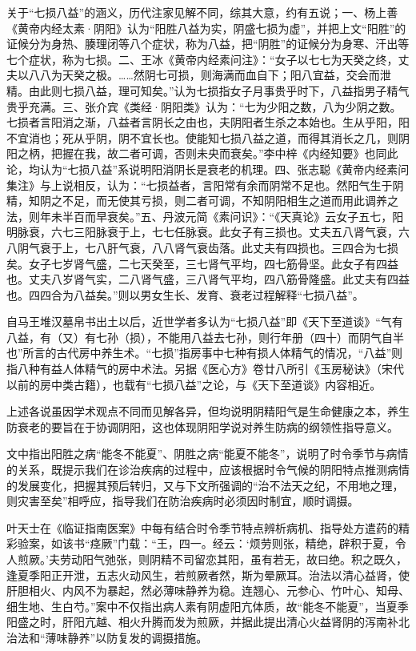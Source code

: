 \documentclass[12pt]{ctexbook}
\begin{document}
关于“七损八益”的涵义，历代注家见解不同，综其大意，约有五说；一、杨上善《黄帝内经太素·阴阳》认为“阳胜八益为实，阴盛七损为虚”，并把上文“阳胜”的证候分为身热、腠理闭等八个症状，称为八益，把“阴胜”的证候分为身寒、汗出等七个症状，称为七损。二、王冰《黄帝内经素问注》：“女子以七七为天癸之终，丈夫以八八为天癸之极。……然阴七可损，则海满而血自下；阳八宜益，交会而泄精。由此则七损八益，理可知矣。”认为七损指女子月事贵乎时下，八益指男子精气贵乎充满。三、张介宾《类经·阴阳类》认为：“七为少阳之数，八为少阴之数。七损者言阳消之渐，八益者言阴长之由也，夫阴阳者生杀之本始也。生从乎阳，阳不宜消也；死从乎阴，阴不宜长也。使能知七损八益之道，而得其消长之几，则阴阳之柄，把握在我，故二者可调，否则未央而衰矣。”李中梓《内经知要》也同此论，均认为“七损八益”系说明阳消阴长是衰老的机理。四、张志聪《黄帝内经素问集注》与上说相反，认为：“七损益者，言阳常有余而阴常不足也。然阳气生于阴精，知阴之不足，而无使其亏损，则二者可调，不知阴阳相生之道而用此调养之法，则年未半百而早衰矣。”五、丹波元简《素问识》：“《天真论》云女子五七，阳明脉衰，六七三阳脉衰于上，七七任脉衰。此女子有三损也。丈夫五八肾气衰，六八阴气衰于上，七八肝气衰，八八肾气衰齿落。此丈夫有四损也。三四合为七损矣。女子七岁肾气盛，二七天癸至，三七肾气平均，四七筋骨坚。此女子有四益也。丈夫八岁肾气实，二八肾气盛，三八肾气平均，四八筋骨隆盛。此丈夫有四益也。四四合为八益矣。”则以男女生长、发育、衰老过程解释“七损八益”。

自马王堆汉墓帛书出土以后，近世学者多认为“七损八益”即《天下至道谈》“气有八益，有（又）有七孙（损），不能用八益去七孙，则行年册（四十）而阴气自半也”所言的古代房中养生术。“七损”指房事中七种有损人体精气的情况，“八益”则指八种有益人体精气的房中术法。另据《医心方》卷廿八所引《玉房秘诀》（宋代以前的房中类古籍），也载有“七损八益”之论，与《天下至道谈》内容相近。

上述各说虽因学术观点不同而见解各异，但均说明阴精阳气是生命健康之本，养生防衰老的要旨在于协调阴阳，这也体现阴阳学说对养生防病的纲领性指导意义。



文中指出阳胜之病“能冬不能夏”、阴胜之病“能夏不能冬”，说明了时令季节与病情的关系，既提示我们在诊治疾病的过程中，应该根据时令气候的阴阳特点推测病情的发展变化，把握其预后转归，又与下文所强调的“治不法天之纪，不用地之理，则灾害至矣”相呼应，指导我们在防治疾病时必须因时制宜，顺时调摄。

叶天士在《临证指南医案》中每有结合时令季节特点辨析病机、指导处方遣药的精彩验案，如该书“痉厥”门载：“王，四一。经云：‘烦劳则张，精绝，辟积于夏，令人煎厥。’夫劳动阳气弛张，则阴精不司留恋其阳，虽有若无，故曰绝。积之既久，逢夏季阳正开泄，五志火动风生，若煎厥者然，斯为晕厥耳。治法以清心益肾，使肝胆相火、内风不为暴起，然必薄味静养为稳。连翘心、元参心、竹叶心、知母、细生地、生白芍。”案中不仅指出病人素有阴虚阳亢体质，故“能冬不能夏”，当夏季阳盛之时，肝阳亢越、相火升腾而发为煎厥，并据此提出清心火益肾阴的泻南补北治法和“薄味静养”以防复发的调摄措施。
\end{document}
